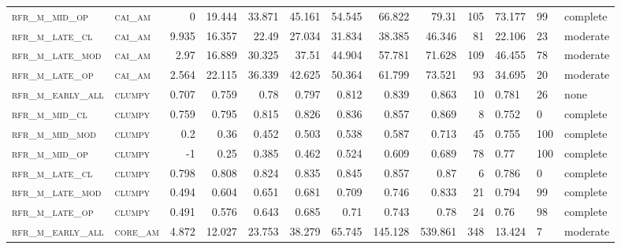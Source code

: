 \begin{landscape}
\begin{center}
\begin{longtable}{llrrrrr|rrr}
\textsc{rfr\_m\_mid\_op   } & \textsc{cai\_am   }   & 0       & 19.444  & 33.871  & 45.161   & 54.545   & 66.822   & 79.31    & 105    & 73.177        & 99            & complete       \\
\textsc{rfr\_m\_late\_cl  } & \textsc{cai\_am   }   & 9.935   & 16.357  & 22.49   & 27.034   & 31.834   & 38.385   & 46.346   & 81     & 22.106        & 23            & moderate       \\
\textsc{rfr\_m\_late\_mod } & \textsc{cai\_am   }   & 2.97    & 16.889  & 30.325  & 37.51    & 44.904   & 57.781   & 71.628   & 109    & 46.455        & 78            & moderate       \\
\textsc{rfr\_m\_late\_op  } & \textsc{cai\_am   }   & 2.564   & 22.115  & 36.339  & 42.625   & 50.364   & 61.799   & 73.521   & 93     & 34.695        & 20            & moderate       \\
\textsc{rfr\_m\_early\_all} & \textsc{clumpy    }   & 0.707   & 0.759   & 0.78    & 0.797    & 0.812    & 0.839    & 0.863    & 10     & 0.781         & 26            & none       \\
\textsc{rfr\_m\_mid\_cl   } & \textsc{clumpy    }   & 0.759   & 0.795   & 0.815   & 0.826    & 0.836    & 0.857    & 0.869    & 8      & 0.752         & 0             & complete           \\
\textsc{rfr\_m\_mid\_mod  } & \textsc{clumpy    }   & 0.2     & 0.36    & 0.452   & 0.503    & 0.538    & 0.587    & 0.713    & 45     & 0.755         & 100           & complete       \\
\textsc{rfr\_m\_mid\_op   } & \textsc{clumpy    }   & -1      & 0.25    & 0.385   & 0.462    & 0.524    & 0.609    & 0.689    & 78     & 0.77          & 100           & complete       \\
\textsc{rfr\_m\_late\_cl  } & \textsc{clumpy    }   & 0.798   & 0.808   & 0.824   & 0.835    & 0.845    & 0.857    & 0.87     & 6      & 0.786         & 0             & complete           \\
\textsc{rfr\_m\_late\_mod } & \textsc{clumpy    }   & 0.494   & 0.604   & 0.651   & 0.681    & 0.709    & 0.746    & 0.833    & 21     & 0.794         & 99            & complete       \\
\textsc{rfr\_m\_late\_op  } & \textsc{clumpy    }   & 0.491   & 0.576   & 0.643   & 0.685    & 0.71     & 0.743    & 0.78     & 24     & 0.76          & 98            & complete       \\
\textsc{rfr\_m\_early\_all} & \textsc{core\_am  }   & 4.872   & 12.027  & 23.753  & 38.279   & 65.745   & 145.128  & 539.861  & 348    & 13.424        & 7             & moderate       \\

\end{longtable}
\end{center}
\end{landscape}

